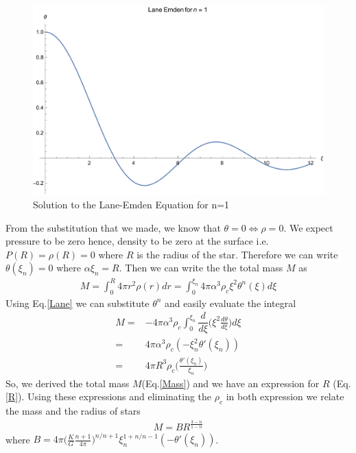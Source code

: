 \documentclass[aps,twocolumn,showpacs,preprintnumbers,nofootinbib,prl,superscriptaddress,groupedaddress]{revtex4-1}
\begin{document}
\begin{figure}
	\centering
	\includegraphics[width=1.0\linewidth]{Figures/n1solution}
	\caption{Solution to the Lane-Emden Equation for n=1}
	\label{fig:n1solution}
\end{figure}

From the substitution that we made, we know that $ \theta = 0 \iff \rho=0 $. We expect pressure to be zero hence, density to be zero at the surface i.e. $P(R) = \rho(R) = 0$ where $R$ is the radius of the star. Therefore we can write $ \theta(\xi_n) = 0 $ where $ \alpha \xi_n =R $. Then we can write the the total mass $M$ as
\begin{align}
	M = \int_{0}^{R} 4\pi r^2 \rho(r) dr = \int_{0}^{\xi_n} 4\pi\alpha^3\rho_c \xi^2 \theta^n(\xi) d\xi
\end{align}
Using Eq.\ref{Lane} we can substitute $\theta^n$ and easily evaluate the integral
\begin{align}\label{Mass}
	M =& -4\pi\alpha^3\rho_c\int_{0}^{\xi_n}\nonumber \dfrac{d}{d\xi}\bigg(\xi^2\frac{d\theta}{d\xi}\bigg)d\xi\\
	=&4\pi\alpha^3\rho_c(-\xi_n^2\theta'(\xi_n))\nonumber\\
	=& 4\pi R^3 \rho_c \bigg(\frac{\theta'(\xi_n)}{\xi_n}\bigg)
\end{align}
So, we derived the total mass $M$(Eq.\ref{Mass}) and we have an expression for $R$ (Eq.\ref{R}). Using these expressions and eliminating the $\rho_c$ in both expression we relate the mass and the radius of stars
\begin{align}\label{M-R}
	M = BR^{\frac{3-n}{1-n}}
\end{align}
where $B = 4\pi\bigg(\frac{K}{G} \frac{n+1}{4\pi}\bigg)^{n/n+1} \xi_n^{1+n/n-1} (-\theta'(\xi_n))$.
\end{document}
